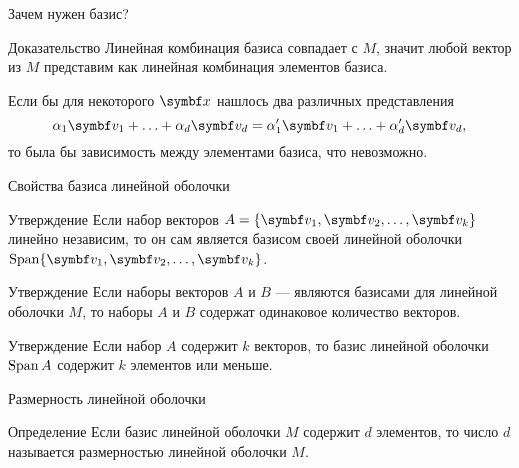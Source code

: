 \begin{frame}{Зачем нужен базис?}


\begin{block}{Доказательство}
Линейная комбинация базиса совпадает с $M$, значит любой вектор из $M$ представим
как линейная комбинация элементов базиса.
\pause

Если бы для некоторого $\bx$ нашлось два различных представления
\[
  \alpha_1 \bv_1 + \ldots + \alpha_d \bv_d = \alpha_1' \bv_1 + \ldots + \alpha_d' \bv_d,
\]
то была бы зависимость между элементами базиса, что невозможно. 
\end{block}

\end{frame}


\begin{frame}{Свойства базиса линейной оболочки}

\begin{block}{Утверждение}
Если набор векторов $A =\{ \bv_1, \bv_2, \ldots, \bv_k\}$ линейно независим, то он сам
является базисом своей линейной оболочки $\Span  \{ \bv_1, \bv_2, \ldots, \bv_k\}$.
\end{block}


\pause
\begin{block}{Утверждение}
Если наборы векторов $A$ и $B$ — являются базисами для линейной оболочки $M$,
то наборы $A$ и $B$ содержат одинаковое количество векторов. 
\end{block}
  
\pause
\begin{block}{Утверждение}
Если набор $A$ содержит $k$ векторов, 
то базис линейной оболочки $\operatorname{Span} A$ содержит $k$ элементов или меньше. 
\end{block}
  


\end{frame}


\begin{frame}{Размерность линейной оболочки}

\begin{block}{Определение}
  Если базис линейной оболочки $M$ содержит $d$ элементов, то 
  число $d$ называется размерностью линейной оболочки $M$. 
\end{block}
    

\end{frame}



